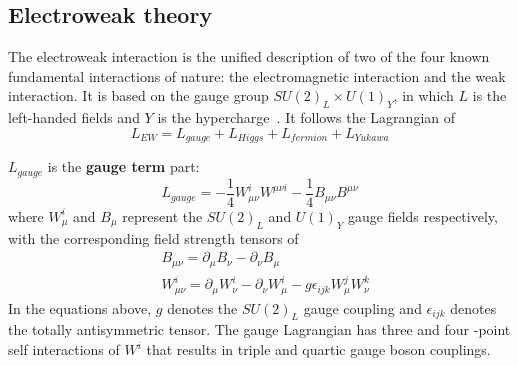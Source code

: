 \subsection{Electroweak theory}
\label{ewktheory}
The electroweak interaction is the unified description of two of the four known fundamental interactions of nature: 
the electromagnetic interaction and the weak interaction.
It is based on the gauge group $SU(2)_{L} \times U(1)_{Y}$, in which $L$ is the left-handed fields and $Y$ is the hypercharge~\cite{Langacker:2009my}.
It follows the Lagrangian of
\begin{equation} \label{eq:Lew}
	L_{EW} = L_{gauge} + L_{Higgs} + L_{fermion} + L_{Yukawa}
\end{equation}

$L_{gauge}$ is the \textbf{gauge term} part:
\begin{equation}
	L_{gauge} = -\frac{1}{4} W^{i}_{\mu\nu} W^{\mu\nu i} - \frac{1}{4} B_{\mu\nu} B^{\mu\nu}
\end{equation}
where $W^{i}_{\mu}$ and $B_{\mu}$ represent the $SU(2)_{L}$ and $U(1)_{Y}$ gauge fields respectively, with the corresponding field strength tensors of
\begin{equation}
\begin{split}
	& B_{\mu\nu} = \partial_{\mu} B_{\nu} - \partial_{\nu} B_{\mu} \\
	& W^{i}_{\mu\nu} = \partial_{\mu} W^{i}_{\nu} - \partial_{\nu} W^{i}_{\mu} - g \epsilon_{ijk} W^{j}_{\mu} W^{k}_{\nu}
\end{split}
\end{equation}
In the equations above, $g$ denotes the $SU(2)_{L}$ gauge coupling and $\epsilon_{ijk}$ denotes the totally antisymmetric tensor.
The gauge Lagrangian has three and four -point self interactions of $W^{i}$ that results in triple and quartic gauge boson couplings.

